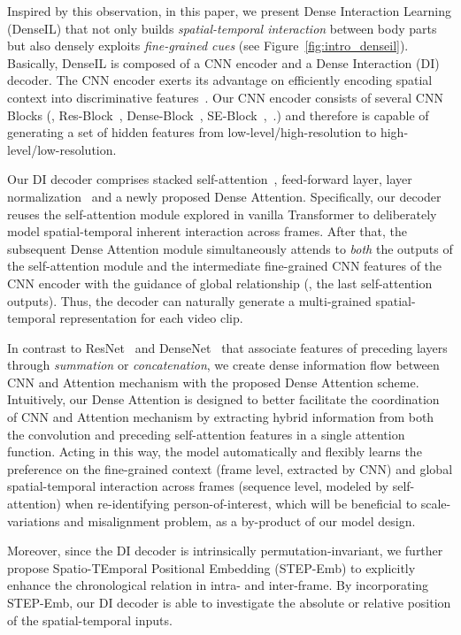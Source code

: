 \documentclass[10pt,twocolumn,letterpaper]{article}
\begin{document}
Inspired by this observation, in this paper, we present Dense Interaction Learning (DenseIL) that not only builds \emph{spatial-temporal interaction} between body parts but also densely exploits \emph{fine-grained cues} (see Figure~\ref{fig:intro_denseil}).
Basically, DenseIL is composed of a CNN encoder and a Dense Interaction (DI) decoder. The CNN encoder exerts its advantage on efficiently encoding spatial context into discriminative features~\cite{lecun1998gradient}. Our CNN encoder consists of several CNN Blocks (\eg, Res-Block~\cite{he2016deep}, Dense-Block~\cite{huang2017densely}, SE-Block~\cite{hu2018squeeze},~\etc.) and therefore is capable of generating a set of hidden features from low-level/high-resolution to high-level/low-resolution.

Our DI decoder comprises stacked self-attention~\cite{vaswani2017attention}, feed-forward layer, layer normalization~\cite{ba2016layer} and a newly proposed Dense Attention.
Specifically, our decoder reuses the self-attention module explored in vanilla Transformer to deliberately model spatial-temporal inherent interaction across frames. After that, the subsequent Dense Attention module simultaneously attends to \emph{both} the outputs of the self-attention module and the intermediate fine-grained CNN features of the CNN encoder with the guidance of global relationship (\ie, the last self-attention outputs). Thus, the decoder can naturally generate a multi-grained spatial-temporal representation for each video clip.

In contrast to ResNet~\cite{he2016deep} and DenseNet~\cite{huang2017densely} that associate features of preceding layers through \emph{summation} or \emph{concatenation}, we create dense information flow between CNN and Attention mechanism with the proposed Dense Attention scheme. Intuitively, our Dense Attention is designed to better facilitate the coordination of CNN and Attention mechanism by extracting hybrid information from both the convolution and preceding self-attention features in a single attention function. Acting in this way, the model automatically and flexibly learns the preference on the fine-grained context (frame level, extracted by CNN) and global spatial-temporal interaction across frames (sequence level, modeled by self-attention) when re-identifying person-of-interest, which will be beneficial to scale-variations and misalignment problem, as a by-product of our model design.

Moreover, since the DI decoder is intrinsically permutation-invariant, we further propose Spatio-TEmporal Positional Embedding (STEP-Emb) to explicitly enhance the chronological relation in intra- and inter-frame. By incorporating STEP-Emb, our DI decoder is able to investigate the absolute or relative position of the spatial-temporal inputs.
\end{document}
